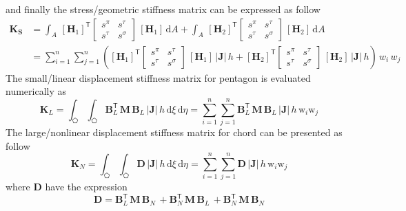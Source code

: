 and finally the stress/geometric stiffness matrix can be expressed as follow
\begin{equation}
\begin{aligned}
\mathbf{K_{\mathbf{S}}} & =  \int_A \, [\mathbf{H}_1]^{\mathsf{T}}  \begin{bmatrix} s^{\pi} & s^{\tau} \\ 
s^{\tau} & s^{\sigma}
\end{bmatrix} \, [\mathbf{H}_1] \, \mathrm{d} A + \int_A \, [\mathbf{H}_2]^{\mathsf{T}}  \begin{bmatrix} s^{\pi} & s^{\tau} \\ 
s^{\tau} & s^{\sigma} 
\end{bmatrix} \, [\mathbf{H}_2] \, \mathrm{d} A\\
& =  \sum_{i=1}^{n} \sum_{j=1}^{n} \left( [\mathbf{H}_1]^{\mathsf{T}}  \begin{bmatrix} s^{\pi} & s^{\tau} \\ 
s^{\tau} & s^{\sigma}
\end{bmatrix} \, [\mathbf{H}_1] \, |\mathbf{J}| \, h  + [\mathbf{H}_2]^{\mathsf{T}}  \begin{bmatrix} s^{\pi} & s^{\tau} \\ 
s^{\tau} & s^{\sigma}
\end{bmatrix} \, [\mathbf{H}_2] \, |\mathbf{J}| \, h \right) \,  w_i \, w_j
\end{aligned}
\end{equation}
The small/linear displacement stiffness matrix for pentagon is evaluated numerically as 
\begin{equation}
\mathbf{K}_{L} = \int_{\pentagon} \int_{\pentagon} \mathbf{B}_L^{\mathsf{T}} \, \mathbf{M} \, \mathbf{B}_L \, |\mathbf{J}| \, h \,  \mathrm{d} \xi \,  \mathrm{d} \eta =  \sum_{i=1}^{n} \sum_{j=1}^{n} \mathbf{B}_L^{\mathsf{T}} \, \mathbf{M} \, \mathbf{B}_L \, |\mathbf{J}|  \, h \, \mathrm{w}_i \mathrm{w}_j
\end{equation}
The large/nonlinear displacement stiffness matrix for chord can be presented as follow
\begin{equation}
\mathbf{K}_{N} = \int_{\pentagon} \int_{\pentagon} \mathbf{D} \, |\mathbf{J}|\, h \, \mathrm{d} \xi \, \mathrm{d} \eta 
= \sum_{i=1}^{n} \sum_{j=1}^{n} \mathbf{D} \, |\mathbf{J}| \, h \, \mathrm{w}_i \mathrm{w}_j
\end{equation}
where $\mathbf{D}$ have the expression 
\begin{equation}
\mathbf{D} = \mathbf{B}_L^{\mathsf{T}} \, \mathbf{M} \, \mathbf{B}_N \, + \mathbf{B}_N^{\mathsf{T}} \, \mathbf{M} \, \mathbf{B}_L \, + \mathbf{B}_N^{\mathsf{T}} \, \mathbf{M} \, \mathbf{B}_N
\end{equation}


